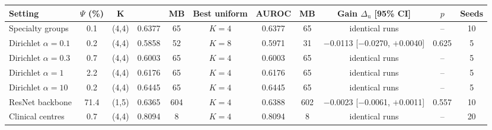 \begin{tabular}{@{}lcccccccccc@{}}
\toprule
Setting & $\Psi$ (\%) & $\mathbf K$ & \tierfed{} & MB & Best uniform & AUROC & MB & Gain $\Delta_{\mathrm u}$ [95\% CI] & $p$ & Seeds\\
\midrule
Specialty groups & 0.1 & (4,4) & 0.6377 & 65 & $K=4$ & 0.6377 & 65 & identical runs & -- & 10\\
Dirichlet $\alpha=0.1$ & 0.2 & (4,4) & 0.5858 & 52 & $K=8$ & 0.5971 & 31 & \ensuremath{-}0.0113 [\ensuremath{-}0.0270, \ensuremath{+}0.0040] & 0.625 & 5\\
Dirichlet $\alpha=0.3$ & 0.7 & (4,4) & 0.6003 & 65 & $K=4$ & 0.6003 & 65 & identical runs & -- & 5\\
Dirichlet $\alpha=1$ & 2.2 & (4,4) & 0.6176 & 65 & $K=4$ & 0.6176 & 65 & identical runs & -- & 5\\
Dirichlet $\alpha=10$ & 0.2 & (4,4) & 0.6445 & 65 & $K=4$ & 0.6445 & 65 & identical runs & -- & 5\\
ResNet backbone & 71.4 & (1,5) & 0.6365 & 604 & $K=4$ & 0.6388 & 602 & \ensuremath{-}0.0023 [\ensuremath{-}0.0061, \ensuremath{+}0.0011] & 0.557 & 10\\
Clinical centres & 0.7 & (4,4) & 0.8094 & 8 & $K=4$ & 0.8094 & 8 & identical runs & -- & 20\\
\bottomrule
\end{tabular}
